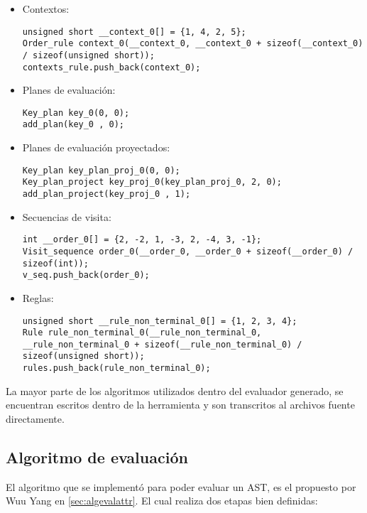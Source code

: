 \begin{itemize}
\item Contextos:
\begin{lstlisting}[columns=fullflexible]
unsigned short __context_0[] = {1, 4, 2, 5};
Order_rule context_0(__context_0, __context_0 + sizeof(__context_0) / sizeof(unsigned short));
contexts_rule.push_back(context_0);
\end{lstlisting}

\item Planes de evaluación:
\begin{lstlisting}[columns=fullflexible, linewidth=4.5cm]
Key_plan key_0(0, 0);
add_plan(key_0 , 0);
\end{lstlisting}

\item Planes de evaluación proyectados:
\begin{lstlisting}[columns=fullflexible, linewidth=9.5cm]
Key_plan key_plan_proj_0(0, 0);
Key_plan_project key_proj_0(key_plan_proj_0, 2, 0);
add_plan_project(key_proj_0 , 1);
\end{lstlisting}

\item Secuencias de visita:
\begin{lstlisting}[columns=fullflexible]
int __order_0[] = {2, -2, 1, -3, 2, -4, 3, -1};
Visit_sequence order_0(__order_0, __order_0 + sizeof(__order_0) / sizeof(int));
v_seq.push_back(order_0);
\end{lstlisting}

\item Reglas:
\begin{lstlisting}[columns=fullflexible]
unsigned short __rule_non_terminal_0[] = {1, 2, 3, 4};
Rule rule_non_terminal_0(__rule_non_terminal_0, __rule_non_terminal_0 + sizeof(__rule_non_terminal_0) / sizeof(unsigned short));
rules.push_back(rule_non_terminal_0);
\end{lstlisting}
\end{itemize}

La mayor parte de los algoritmos utilizados dentro del evaluador generado, se encuentran escritos dentro de la herramienta y son transcritos al archivos fuente directamente.

\subsection{Algoritmo de evaluación}
\label{sec:codcppalgeval}

El algoritmo que se implementó para poder evaluar un AST, es el propuesto por Wuu Yang en \ref{sec:algevalattr}. El cual realiza dos etapas bien definidas:

